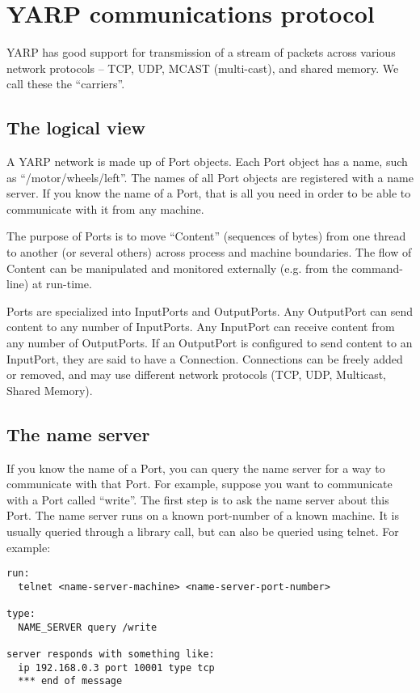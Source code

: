 
\section{YARP communications protocol}

YARP has good support for transmission of a stream of packets
across various network protocols -- TCP, UDP, MCAST (multi-cast),
and shared memory.  We call these the ``carriers''.

\subsection{The logical view}

A YARP network is made up of Port objects.  Each Port object has
a name, such as ``/motor/wheels/left''.  The names of all Port
objects are registered with a name server.  If you know the name
of a Port, that is all you need in order to be able to 
communicate with it from any machine.

The purpose of Ports is to move ``Content'' (sequences of bytes) from
one thread to another (or several others) across process and machine
boundaries.  The flow of Content can be manipulated and monitored
externally (e.g. from the command-line) at run-time.

Ports are specialized into InputPorts and OutputPorts.
Any OutputPort can send content to any number of InputPorts.  Any
InputPort can receive content from any number of OutputPorts.  If an
OutputPort is configured to send content to an InputPort, they are
said to have a Connection.  Connections can be freely added or 
removed, and may use different network protocols (TCP, UDP, Multicast, Shared
Memory).




\subsection{The name server}

If you know the name
of a Port, you can query the name server for a way to communicate
with that Port.
For example, suppose you want to communicate with a Port called
``write''.  The first step is to ask the name server about this
Port.  The name server runs on a known port-number of a known machine.
It is usually queried through a library call, but can also be
queried using telnet.  For example:

\begin{verbatim}
run:
  telnet <name-server-machine> <name-server-port-number>

type:
  NAME_SERVER query /write

server responds with something like:
  ip 192.168.0.3 port 10001 type tcp
  *** end of message
\end{verbatim}

